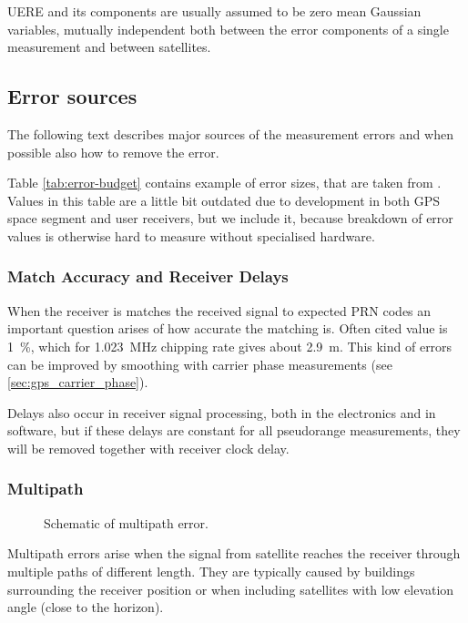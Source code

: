 UERE and its components are usually assumed to be zero mean Gaussian variables,
mutually independent both between the error components of a single measurement and between satellites.

\subsection{Error sources}

The following text describes major sources of the measurement errors and when possible
also how to remove the error.

Table \ref{tab:error-budget} contains example of error sizes, that are taken from
\cite{kaplan06}.
Values in this table are a little bit outdated due to development in both GPS space
segment and user receivers, but we include it, because breakdown of error values is otherwise hard to measure
without specialised hardware.

\subsubsection{Match Accuracy and Receiver Delays}

When the receiver is matches the received signal to expected PRN codes an 
important question arises of how accurate the matching is.
Often cited value is \SI{1}{\percent}, which for \SI{1.023}{\mega\hertz}
chipping rate gives about \SI{2.9}{\meter}.
This kind of errors can be improved by smoothing with carrier phase measurements (see
\autoref{sec:gps_carrier_phase}).

Delays also occur in receiver signal processing, both in the electronics and in software,
but if these delays are constant for all pseudorange measurements, they will be removed
together with receiver clock delay.

\subsubsection{Multipath}

\begin{figure}[t]
	\centering
	
	\caption{Schematic of multipath error.}
	\label{fig:multipath}
\end{figure}

Multipath errors arise when the signal from satellite reaches the receiver
through multiple paths of different length.
They are typically caused by buildings surrounding the receiver position or
when including satellites with low elevation angle (close to the horizon).

